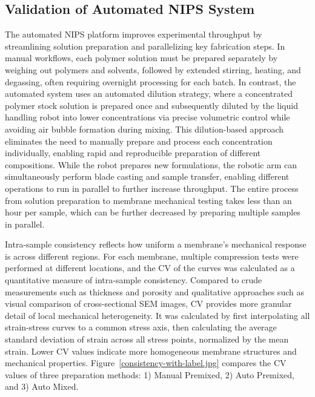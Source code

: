 \documentclass[preprint,12pt,times]{elsarticle}
\begin{document}
\subsection{Validation of Automated NIPS System}
The automated NIPS platform improves experimental throughput by streamlining solution preparation and parallelizing key fabrication steps. In manual workflows, each polymer solution must be prepared separately by weighing out polymers and solvents, followed by extended stirring, heating, and degassing, often requiring overnight processing for each batch. In contrast, the automated system uses an automated dilution strategy, where a concentrated polymer stock solution is prepared once and subsequently diluted by the liquid handling robot into lower concentrations via precise volumetric control while avoiding air bubble formation during mixing. This dilution-based approach eliminates the need to manually prepare and process each concentration individually, enabling rapid and reproducible preparation of different compositions. While the robot prepares new formulations, the robotic arm can simultaneously perform blade casting and sample transfer, enabling different operations to run in parallel to further increase throughput. The entire process from solution preparation to membrane mechanical testing takes less than an hour per sample, which can be further decreased by preparing multiple samples in parallel.

Intra-sample consistency reflects how uniform a membrane's mechanical response is across different regions. For each membrane, multiple compression tests were performed at different locations, and the CV of the curves was calculated as a quantitative measure of intra-sample consistency. Compared to crude measurements such as thickness and porosity and qualitative approaches such as visual comparison of cross-sectional SEM images, CV provides more granular detail of local mechanical heterogeneity. It was calculated by first interpolating all strain-stress curves to a common stress axis, then calculating the average standard deviation of strain across all stress points, normalized by the mean strain. Lower CV values indicate more homogeneous membrane structures and mechanical properties. Figure~\ref{consistency-with-label.jpg} compares the CV values of three preparation methods: 1) Manual Premixed, 2) Auto Premixed, and 3) Auto Mixed. 
    
\end{document}
